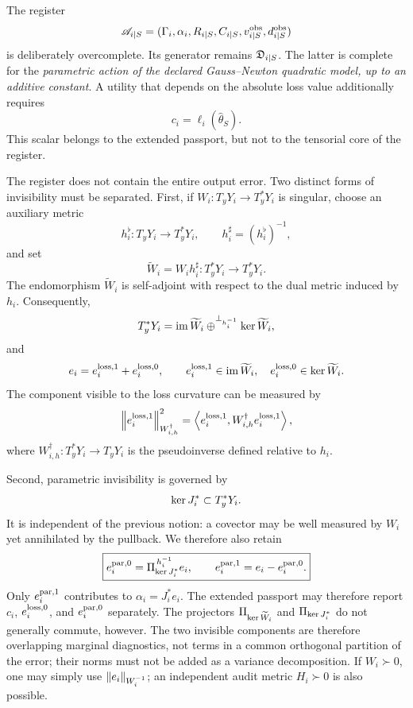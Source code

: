 \begin{remark}
The register
\[
\mathscr A_{i\mid S}
=(\Gamma_i,\alpha_i,R_{i\mid S},C_{i\mid S},v_{i\mid S}^{\rm obs},d_{i\mid S}^{\rm obs})
\]
is deliberately overcomplete. Its generator remains $\mathfrak D_{i\mid S}$. The latter is complete for the \emph{parametric action of the declared Gauss--Newton quadratic model, up to an additive constant}. A utility that depends on the absolute loss value additionally requires
\[
c_i=\ell_i(\widehat\theta_S).
\]
This scalar belongs to the extended passport, but not to the tensorial core of the register.

The register does not contain the entire output error. Two distinct forms of invisibility must be separated. First, if $W_i:T_yY_i\to T_y^*Y_i$ is singular, choose an auxiliary metric
\[
h_i^\flat:T_yY_i\longrightarrow T_y^*Y_i,
\qquad h_i^\sharp=(h_i^\flat)^{-1},
\]
and set
\[
\widetilde W_i=W_i h_i^\sharp:T_y^*Y_i\longrightarrow T_y^*Y_i.
\]
The endomorphism $\widetilde W_i$ is self-adjoint with respect to the dual metric induced by $h_i$. Consequently,
\[
T_y^*Y_i=\operatorname{im}\widetilde W_i\oplus^{\perp_{h_i^{-1}}}\operatorname{ker}\widetilde W_i,
\]
and
\[
e_i=e_i^{\rm loss,1}+e_i^{\rm loss,0},
\qquad
e_i^{\rm loss,1}\in\operatorname{im}\widetilde W_i,
\quad
e_i^{\rm loss,0}\in\operatorname{ker}\widetilde W_i.
\]
The component visible to the loss curvature can be measured by
\[
\left\lVert e_i^{\rm loss,1}\right\rVert_{W_{i,h}^{\dagger}}^2
=\left\langle e_i^{\rm loss,1},W_{i,h}^{\dagger}e_i^{\rm loss,1}\right\rangle,
\]
where $W_{i,h}^{\dagger}:T_y^*Y_i\to T_yY_i$ is the pseudoinverse defined relative to $h_i$.

Second, parametric invisibility is governed by
\[
\operatorname{ker} J_i^*\subset T_y^*Y_i.
\]
It is independent of the previous notion: a covector may be well measured by $W_i$ yet annihilated by the pullback. We therefore also retain
\[
\boxed{
 e_i^{\rm par,0}
 =\Pi_{\operatorname{ker} J_i^*}^{\,h_i^{-1}}e_i,
 \qquad
 e_i^{\rm par,1}=e_i-e_i^{\rm par,0}.
}
\]
Only $e_i^{\rm par,1}$ contributes to $\alpha_i=J_i^*e_i$. The extended passport may therefore report $c_i$, $e_i^{\rm loss,0}$, and $e_i^{\rm par,0}$ separately. The projectors $\Pi_{\operatorname{ker}\widetilde W_i}$ and $\Pi_{\operatorname{ker} J_i^*}$ do not generally commute, however. The two invisible components are therefore overlapping marginal diagnostics, not terms in a common orthogonal partition of the error; their norms must not be added as a variance decomposition. If $W_i\succ0$, one may simply use $\left\lVert e_i\right\rVert_{W_i^{-1}}$; an independent audit metric $H_i\succ0$ is also possible.
\end{remark}

